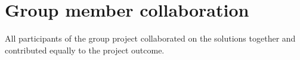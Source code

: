 \documentclass[12pt, ]{scrartcl}
\begin{document}
\fi

\newpage
\section*{Group member collaboration}
All participants of the group project collaborated on the solutions together and contributed equally to the project outcome. 
\end{document}
